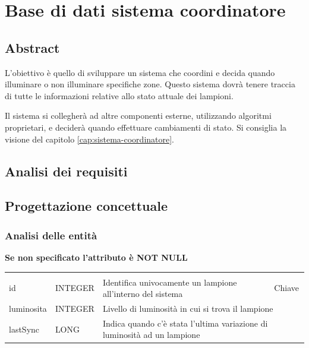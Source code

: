 \section{Base di dati sistema coordinatore}\label{cap:db-sistema-coordinatore}

\subsection{Abstract}

L'obiettivo è quello di sviluppare un sistema che coordini e decida quando illuminare o non illuminare specifiche zone. Questo sistema dovrà tenere traccia di tutte le informazioni relative allo stato attuale dei lampioni.

Il sistema si collegherà ad altre componenti esterne, utilizzando algoritmi proprietari, e deciderà quando effettuare cambiamenti di stato. Si consiglia la visione del capitolo \ref{cap:sistema-coordinatore}.


\subsection{Analisi dei requisiti}

\subsection{Progettazione concettuale}

\subsubsection{Analisi delle entità}

\textbf{Se non specificato l'attributo è NOT NULL}

\begin{center}
    \begin{tabularx}{\textwidth}{|l|l|l|X|}
        \hline
        \rowcolor{gray!30}
        \multicolumn{4}{|c|}{\textbf{LAMPIONE}}\\
        id & INTEGER & Identifica univocamente un lampione all'interno del sistema & Chiave\\
        \hline
        luminosita & INTEGER & \multicolumn{2}{l|}{Livello di luminosità in cui si trova il lampione} \\
        \hline
        lastSync & LONG & \multicolumn{2}{l|}{Indica quando c'è stata l'ultima variazione di luminosità ad un lampione} \\
        \hline
    \end{tabularx}
\end{center}

